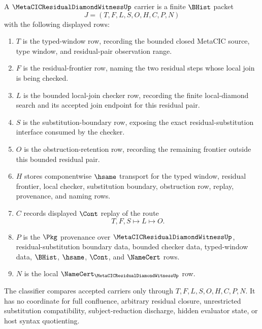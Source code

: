 \begin{definition}
\label{def:metacic-residual-diamond-witness-carrier}
A $\MetaCICResidualDiamondWitnessUp$ carrier is a finite $\BHist$ packet
$$
J=(T,F,L,S,O,H,C,P,N)
$$
with the following displayed rows:
\begin{enumerate}
\item $T$ is the typed-window row, recording the bounded closed MetaCIC source, type window, and residual-pair observation range.
\item $F$ is the residual-frontier row, naming the two residual steps whose local join is being checked.
\item $L$ is the bounded local-join checker row, recording the finite local-diamond search and its accepted join endpoint for this residual pair.
\item $S$ is the substitution-boundary row, exposing the exact residual-substitution interface consumed by the checker.
\item $O$ is the obstruction-retention row, recording the remaining frontier outside this bounded residual pair.
\item $H$ stores componentwise $\hsame$ transport for the typed window, residual frontier, local checker, substitution boundary, obstruction row, replay, provenance, and naming rows.
\item $C$ records displayed $\Cont$ replay of the route
$$
T,F,S \longmapsto L \longmapsto O .
$$
\item $P$ is the $\Pkg$ provenance over $\MetaCICResidualDiamondWitnessUp$, residual-substitution boundary data, bounded checker data, typed-window data, $\BHist$, $\hsame$, $\Cont$, and $\NameCert$ rows.
\item $N$ is the local $\NameCert_{\MetaCICResidualDiamondWitnessUp}$ row.
\end{enumerate}
The classifier compares accepted carriers only through $T,F,L,S,O,H,C,P,N$. It has no coordinate for full confluence, arbitrary residual closure, unrestricted substitution compatibility, subject-reduction discharge, hidden evaluator state, or host syntax quotienting.
\end{definition}

